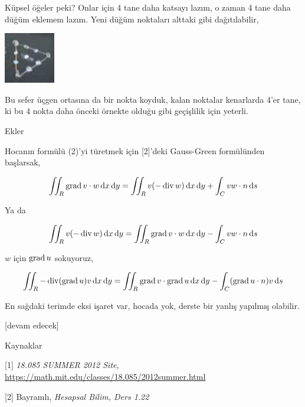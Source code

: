 \documentclass[12pt,fleqn]{article}\usepackage{../../common}
\begin{document}
Küpsel öğeler peki? Onlar için 4 tane daha katsayı lazım, o zaman 4 tane
daha düğüm eklemem lazım. Yeni düğüm noktaları alttaki gibi dağıtılabilir,

\includegraphics[width=6em]{compscieng_1_27_07.png}

Bu sefer üçgen ortasına da bir nokta koyduk, kalan noktalar kenarlarda 4'er
tane, ki bu 4 nokta daha önceki örnekte olduğu gibi geçişlilik için yeterli.

Ekler

Hocanın formülü (2)'yi türetmek için [2]'deki Gauss-Green formülünden başlarsak,

$$
\iint_R \operatorname{grad} v \cdot w  \,\mathrm{d} x \,\mathrm{d} y =
\iint_R v (-\operatorname{div} w) \,\mathrm{d} x \,\mathrm{d} y + \int_C v w \cdot n \,\mathrm{d} s
$$

Ya da

$$
\iint_R v (-\operatorname{div} w) \,\mathrm{d} x \,\mathrm{d} y  =
\iint_R \operatorname{grad} v \cdot w  \,\mathrm{d} x \,\mathrm{d} y - \int_C v w \cdot n \,\mathrm{d} s
$$

$w$ için $\operatorname{grad} u$ sokuyoruz,

$$
\iint_R -\operatorname{div} (\operatorname{grad} u) v \,\mathrm{d} x \,\mathrm{d} y  =
\iint_R \operatorname{grad} v \cdot \operatorname{grad} u  \,\mathrm{d} x \,\mathrm{d} y - \int_C (\operatorname{grad} u \cdot n) v \,\mathrm{d} s
$$

En sağdaki terimde eksi işaret var, hocada yok, derste bir yanlış yapılmış
olabilir.

[devam edecek]

Kaynaklar

[1] {\em 18.085 SUMMER 2012 Site},
    \url{https://math.mit.edu/classes/18.085/2012summer.html}

[2] Bayramlı, {\em Hesapsal Bilim, Ders 1.22} 
    
\end{document}
